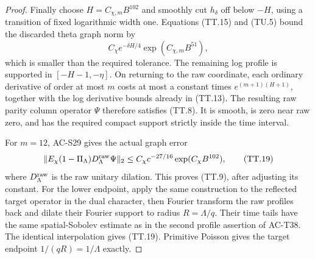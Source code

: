 \begin{proof}
Finally choose \(H=C_{\chi,m}B^{102}\) and smoothly cut
\(h_\delta\) off below \(-H\), using a transition of fixed
logarithmic width one.  Equations (TT.15) and (TU.5)
bound the discarded theta graph norm by
\[
       C_\chi e^{-\delta H/4}
                           \exp(C_{\chi,m}B^{51}),
 \]
which is smaller than the required tolerance.
The remaining log profile is supported in
\([-H-1,-\eta]\).
On returning to the raw coordinate,
each ordinary derivative of order at most \(m\) costs
at most a constant times \(e^{(m+1)(H+1)}\), together
with the log derivative bounds already in (TT.13).
The resulting raw parity column operator \(\Psi\)
therefore satisfies (TT.8).
It is smooth, is zero near raw zero, and has the required
compact support strictly inside the time interval.

For \(m=12\), AC-S29 gives the actual graph error
\[
  \|E_\chi(1-\Pi_\Lambda)D_\Lambda^{\rm raw}\Psi\|_2
       \leq C_\chi c^{-27/16}\exp(C_\chi B^{102}),
 \tag{TT.19}
\]
where \(D_\Lambda^{\rm raw}\) is the raw unitary dilation.
This proves (TT.9), after adjusting its constant.
For the lower endpoint, apply the same construction to
the reflected target operator in the dual character,
then Fourier transform the raw profiles back and dilate
their Fourier support to radius \(R=\Lambda/q\).
Their time tails have the same spatial-Sobolev estimate
as in the second profile assertion of AC-T38.
The identical interpolation gives (TT.19).
Primitive Poisson gives the target endpoint
\(1/(qR)=1/\Lambda\) exactly.
\end{proof}

